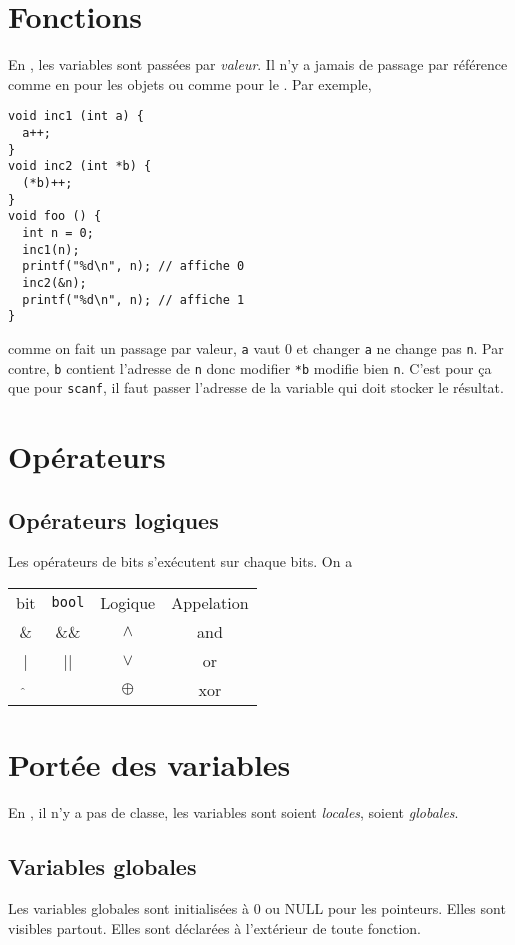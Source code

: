 \section{Fonctions}
En \clang{}, les variables sont passées par \emph{valeur}.
Il n'y a jamais de passage par référence comme en \java{} pour les objets
ou comme pour le \oz{}.
Par exemple,
\begin{lstlisting}
void inc1 (int a) {
  a++;
}
void inc2 (int *b) {
  (*b)++;
}
void foo () {
  int n = 0;
  inc1(n);
  printf("%d\n", n); // affiche 0
  inc2(&n);
  printf("%d\n", n); // affiche 1
}
\end{lstlisting}
comme on fait un passage par valeur,
\lstinline|a| vaut 0 et changer \lstinline|a| ne change pas \lstinline|n|.
Par contre, \lstinline|b| contient l'adresse de \lstinline|n| donc modifier
\lstinline|*b| modifie bien \lstinline|n|.
C'est pour ça que pour \lstinline|scanf|,
il faut passer l'adresse de la variable qui doit stocker le résultat.

\section{Opérateurs}
\subsection{Opérateurs logiques}
Les opérateurs de bits s'exécutent sur chaque bits.
On a
\begin{center}
  \begin{tabular}{cccc}
    \clang{} bit & \clang{} \lstinline|bool| & Logique & Appelation\\
    \& & \&\& & $\land$ & and\\
    | & || & $\lor$ & or\\
    $\hat{}$ &  & $\oplus$ & xor
  \end{tabular}
\end{center}

\section{Portée des variables}
En \clang{}, il n'y a pas de classe,
les variables sont soient \emph{locales}, soient \emph{globales}.

\subsection{Variables globales}
Les variables globales sont initialisées à 0 ou NULL pour les pointeurs.
Elles sont visibles partout.
Elles sont déclarées à l'extérieur de toute fonction.

